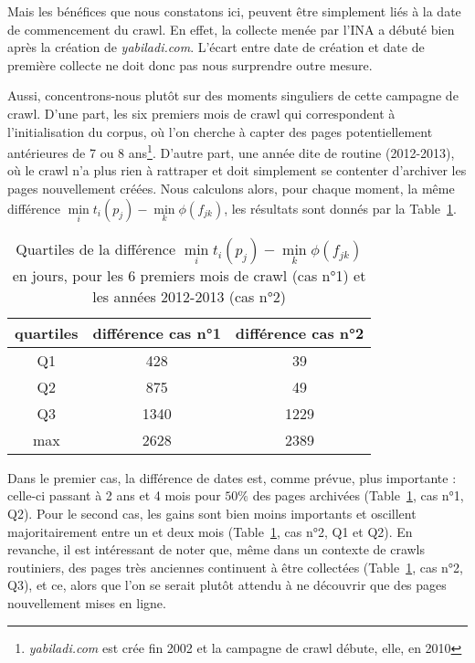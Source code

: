 \documentclass[symmetric,justified,marginals=raggedouter]{tufte-book}
\begin{document}
\noindent Mais les bénéfices que nous constatons ici, peuvent être simplement liés à la date de commencement du crawl. En effet, la collecte menée par l'INA a débuté bien après la création de \textit{yabiladi.com}. L'écart entre date de création et date de première collecte ne doit donc pas nous surprendre outre mesure.

Aussi, concentrons-nous plutôt sur des moments singuliers de cette campagne de crawl. D'une part, les six premiers mois de crawl qui correspondent à l'initialisation du corpus, où l'on cherche à capter des pages potentiellement antérieures de 7 ou 8 ans\footnote{\RaggedOuter \textit{yabiladi.com} est crée fin 2002 et la campagne de crawl débute, elle, en 2010}. D'autre part, une année dite de routine (2012-2013), où le crawl n'a plus rien à rattraper et doit simplement se contenter d'archiver les pages nouvellement créées. Nous calculons alors, pour chaque moment, la même différence $\min\limits_{i} t_i(p_j) - \min\limits_{k} \phi(f_{jk})$, les résultats sont donnés par la Table~\ref{tab:quartiles_2}.

\begin{table}
\centering
\hspace{2em}%
  \label{tab:quartiles_2}
  \begin{tabular}{ccc}
    \toprule
    quartiles&différence cas n°1&différence cas n°2\\
    \midrule
    Q1 & 428 & 39\\
    Q2 & 875 & 49\\
    Q3 & 1340 & 1229\\
    max & 2628 & 2389\\      
  \bottomrule
\end{tabular}
  \bigskip
  \caption{Quartiles de la différence $\min\limits_{i} t_i(p_j) - \min\limits_{k} \phi(f_{jk})$ en jours, pour les 6 premiers mois de crawl (cas n°1) et les années 2012-2013 (cas n°2)}
\end{table} 

\noindent Dans le premier cas, la différence de dates est, comme prévue, plus importante : celle-ci passant à 2 ans et 4 mois pour $50\%$ des pages archivées (Table~\ref{tab:quartiles_2}, cas n°1, Q2). Pour le second cas, les gains sont bien moins importants et oscillent majoritairement entre un et deux mois (Table~\ref{tab:quartiles_2}, cas n°2, Q1 et Q2). En revanche, il est intéressant de noter que, même dans un contexte de crawls routiniers, des pages très anciennes continuent à être collectées (Table~\ref{tab:quartiles_2}, cas n°2, Q3), et ce, alors que l'on se serait plutôt attendu à ne découvrir que des pages nouvellement mises en ligne.
\end{document}
